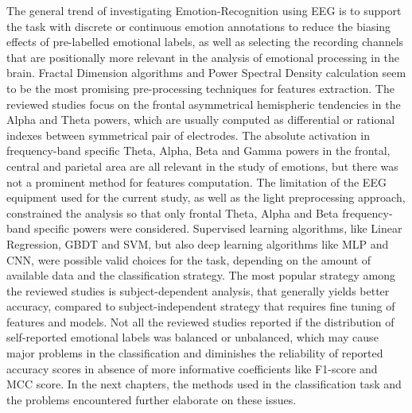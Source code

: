 The general trend of investigating Emotion-Recognition using \ac{EEG} is to support the task with discrete or continuous emotion annotations to reduce the biasing effects of pre-labelled emotional labels, as well as selecting the recording channels that are positionally more relevant in the analysis of emotional processing in the brain. Fractal Dimension algorithms and Power Spectral Density calculation seem to be the most promising pre-processing techniques for features extraction. The reviewed studies focus on the frontal asymmetrical hemispheric tendencies in the Alpha and Theta powers, which are usually computed as differential or rational indexes between symmetrical pair of electrodes. The absolute activation in frequency-band specific Theta, Alpha, Beta and Gamma powers in the frontal, central and parietal area are all relevant in the study of emotions, but there was not a prominent method for features computation. The limitation of the \ac{EEG} equipment used for the current study, as well as the light preprocessing approach, constrained the analysis so that only frontal Theta, Alpha and Beta frequency-band specific powers were considered. Supervised learning algorithms, like Linear Regression, \ac{GBDT} and \ac{SVM}, but also deep learning algorithms like \ac{MLP} and \ac{CNN}, were possible valid choices for the task, depending on the amount of available data and the classification strategy. The most popular strategy among the reviewed studies is subject-dependent analysis, that generally yields better accuracy, compared to subject-independent strategy that requires fine tuning of features and models. Not all the reviewed studies reported if the distribution of self-reported emotional labels was balanced or unbalanced, which may cause major problems in the classification and diminishes the reliability of reported accuracy scores in absence of more informative coefficients like F1-score and \ac{MCC} score. In the next chapters, the methods used in the classification task and the problems encountered further elaborate on these issues.





